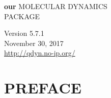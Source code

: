 \documentclass[a4paper,10pt]{article}
\newcommand{\dirfig}{./pictures}
\begin{document}
\setcaptionmargin{0.5cm} %
\thispagestyle{empty}
\begin{figure}[h]
\begin{center}
\end{center}
\end{figure}
\begin{center}
\huge{\textbf{our}} 
{\fontsize{46}{46}\selectfont M}{\fontsize{30}{30}\selectfont OLECULAR}
{\fontsize{46}{46}\selectfont D}{\fontsize{30}{30}\selectfont YNAMICS}\\
\vspace{0.2cm}
{\fontsize{30}{30}\selectfont PACKAGE}




\vspace{8.0cm}
\Huge{Version 5.7.1}\\
\Huge{November 30, 2017}\\
\vspace{0.8cm}
\large{\url{http://qdyn.no-ip.org/}}
\end{center}



\newpage
\tableofcontents
\newpage



\section{PREFACE}
\end{document}

